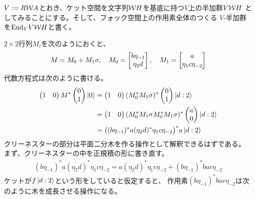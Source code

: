 {	$V:=R{{\mathcal{W}}} A$とおき、ケット空間を文字列${{\mathcal{W}}} H$を基底に持つ$V$上の半加群$V{{\mathcal{W}}} H$
	としてみることにする。そして、フォック空間上の作用素全体のつくる
	$V$-半加群を${\operatorname{End}}_VV{{\mathcal{W}}} H$と書く。

	$2\times2$行列$M_i$を次のようにおくと、
	\begin{equation*}\begin{split}
		M = M_0 + M_1\sigma,\quad M_0 = \begin{bmatrix}{b\eta_{-1}}\\{\eta_2d}\end{bmatrix}
		,\quad M_1 = \begin{bmatrix}{a}\\{\eta_1c\eta_{-2}}\end{bmatrix}
	\end{split}\end{equation*}
	代数方程式は次のように書ける。
	\begin{equation*}\begin{split}
		\begin{pmatrix}
			1 & 0
		\end{pmatrix}M^*\begin{pmatrix}
			0 \\ 1
		\end{pmatrix}\mathinner{|{0}\rangle} &= \begin{pmatrix}
			1 & 0
		\end{pmatrix}(M_0^*M_1\sigma)^*\begin{pmatrix}
			0 \\ 1
		\end{pmatrix}\mathinner{|{d:2}\rangle} \\
		&= \begin{pmatrix}
			1 & 0
		\end{pmatrix}(M_0^*M_1\sigma M_0^*M_1\sigma)^*\begin{pmatrix}
			a \\ 0
		\end{pmatrix}\mathinner{|{d:2}\rangle} \\
		&= \bigl((b\eta_{-1})^*a(\eta_2d)^*\eta_1c\eta_{-2}\bigr)^*
			a\mathinner{|{d:2}\rangle} \\
	\end{split}\end{equation*}
	クリーネスターの部分は平面二分木を作る操作として解釈できるはずである。
	まず、クリーネスターの中を正規積の形に書き直す。
	\begin{equation*}\begin{split}
		(b\eta_{-1})^*a(\eta_2d)^*\eta_1c\eta_{-2}
		= a(\eta_2d)^*\eta_1c\eta_{-2} + (b\eta_{-1})^*bac\eta_{-2}
	\end{split}\end{equation*}
	ケットが$f\mathinner{|{d:2}\rangle}$という形をしていると仮定すると、
	作用素$(b\eta_{-1})^*bac\eta_{-2}$は次のように木を成長させる操作になる。
	\begin{equation*}\begin{split}

\end{split}
\end{equation*}}
